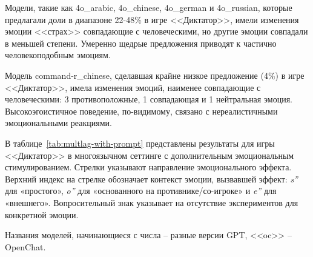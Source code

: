 Модели, такие как 4o\_arabic, 4o\_chinese, 4o\_german и 4o\_russian, которые предлагали доли в диапазоне 22-48\% в игре <<Диктатор>>, имели изменения эмоции <<страх>> совпадающие с человеческими, но другие эмоции совпадали в меньшей степени. Умеренно щедрые предложения приводят к частично человекоподобным эмоциям.

Модель command-r\_chinese, сделавшая крайне низкое предложение (4\%) в игре <<Диктатор>>, имела изменения эмоций, наименее совпадающие с человеческими: 3 противоположные, 1 совпадающая и 1 нейтральная эмоция. Высокоэгоистичное поведение, по-видимому, связано с нереалистичными эмоциональными реакциями.

В таблице~\ref{tab:multlag-with-prompt} представлены результаты для игры <<Диктатор>> в многоязычном сеттинге с дополнительным эмоциональным стимулированием.
Стрелки указывают направление эмоционального эффекта. Верхний индекс на стрелке обозначает контекст эмоции, вызвавшей эффект: \textit{s''} для «простого», \textit{o''} для «основанного на противнике/со-игроке» и \textit{e''} для «внешнего». Вопросительный знак указывает на отсутствие экспериментов для конкретной эмоции.

Названия моделей, начинающиеся с числа -- разные версии GPT, <<oc>> -- OpenChat.


